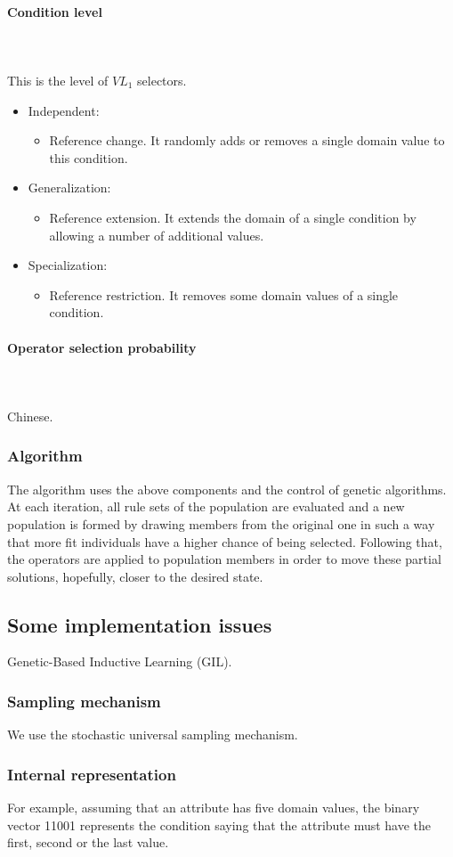 \documentclass[12pt]{article}
\newcommand{\myparagraph}[1]{\paragraph{#1}\mbox{}\\\\}
\begin{document}
\myparagraph{Condition level}
This is the level of $VL_1$ selectors.
\begin{itemize}
\item Independent:
\begin{itemize}
\item Reference change. It randomly adds or removes a single domain value to this condition.
\end{itemize}
\item Generalization:
\begin{itemize}
\item Reference extension. It extends the domain of a single condition by allowing a number of additional values.
\end{itemize}
\item Specialization:
\begin{itemize}
\item Reference restriction. It removes some domain values of a single condition.
\end{itemize}
\end{itemize}

\myparagraph{Operator selection probability}
Chinese.

\subsubsection{Algorithm}
The algorithm uses the above components and the control of genetic algorithms. At each iteration, all rule sets of the population are evaluated and a new population is formed by drawing members from the original one in such a way that more fit individuals have a higher chance of being selected. Following that, the operators are applied to population members in order to move these partial solutions, hopefully, closer to the desired state.

\subsection{Some implementation issues}
Genetic-Based Inductive Learning (GIL).

\subsubsection{Sampling mechanism}
We use the stochastic universal sampling mechanism.

\subsubsection{Internal representation}
For example, assuming that an attribute has five domain values, the binary vector 11001 represents the condition saying that the attribute must have the first, second or the last value.
\end{document}
